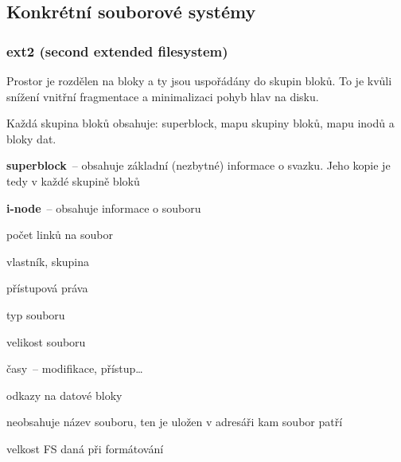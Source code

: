 \subsection{Konkrétní souborové systémy}

\subsubsection*{ext2 (second extended filesystem)}

\begin{pitemize}
  \item Prostor je rozdělen na bloky a ty jsou uspořádány do skupin bloků. To je kvůli
  snížení vnitřní fragmentace a minimalizaci pohyb hlav na disku.
  \item Každá skupina bloků obsahuje: superblock, mapu skupiny bloků, mapu inodů
  a bloky dat.
  \item \textbf{superblock}~-- obsahuje základní (nezbytné) informace o svazku. Jeho kopie
  je tedy v každé skupině bloků 
  \item \textbf{i-node}~-- obsahuje informace o souboru
  \begin{pitemize}
    \item počet linků na soubor
    \item vlastník, skupina
    \item přístupová práva
    \item typ souboru
    \item velikost souboru
    \item časy~-- modifikace, přístup\dots
    \item odkazy na datové bloky
    \item neobsahuje název souboru, ten je uložen v adresáři kam soubor patří
  \end{pitemize}
  \item velkost FS daná při formátování
\end{pitemize}


